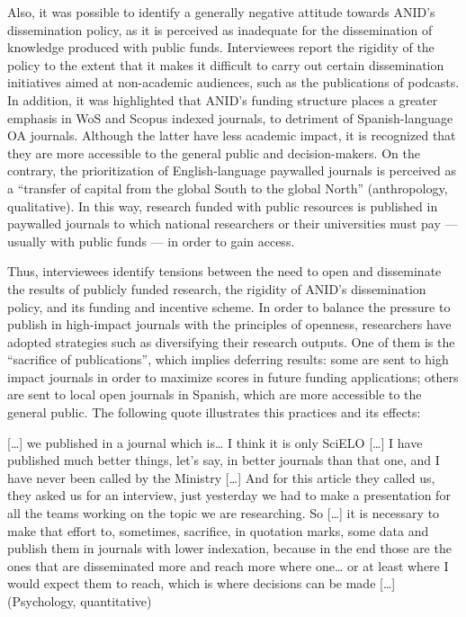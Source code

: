 \documentclass[
  english,
  letterpaper,
]{article}
\begin{document}
Also, it was possible to identify a generally negative attitude towards
ANID's dissemination policy, as it is perceived as inadequate for the
dissemination of knowledge produced with public funds. Interviewees
report the rigidity of the policy to the extent that it makes it
difficult to carry out certain dissemination initiatives aimed at
non-academic audiences, such as the publications of podcasts. In
addition, it was highlighted that ANID's funding structure places a
greater emphasis in WoS and Scopus indexed journals, to detriment of
Spanish-language OA journals. Although the latter have less academic
impact, it is recognized that they are more accessible to the general
public and decision-makers. On the contrary, the prioritization of
English-language paywalled journals is perceived as a ``transfer of
capital from the global South to the global North'' (anthropology,
qualitative). In this way, research funded with public resources is
published in paywalled journals to which national researchers or their
universities must pay --- usually with public funds --- in order to gain
access.

Thus, interviewees identify tensions between the need to open and
disseminate the results of publicly funded research, the rigidity of
ANID's dissemination policy, and its funding and incentive scheme. In
order to balance the pressure to publish in high-impact journals with
the principles of openness, researchers have adopted strategies such as
diversifying their research outputs. One of them is the ``sacrifice of
publications'', which implies deferring results: some are sent to high
impact journals in order to maximize scores in future funding
applications; others are sent to local open journals in Spanish, which
are more accessible to the general public. The following quote
illustrates this practices and its effects:

\begin{tcolorbox}[enhanced jigsaw, opacityback=0, left=2mm, breakable, colframe=quarto-callout-color-frame, arc=.35mm, leftrule=.75mm, toprule=.15mm, bottomrule=.15mm, colback=white, rightrule=.15mm]

{[}\ldots{]} we published in a journal which is\ldots{} I think it is
only SciELO {[}\ldots{]} I have published much better things, let's say,
in better journals than that one, and I have never been called by the
Ministry {[}\ldots{]} And for this article they called us, they asked us
for an interview, just yesterday we had to make a presentation for all
the teams working on the topic we are researching. So {[}\ldots{]} it is
necessary to make that effort to, sometimes, sacrifice, in quotation
marks, some data and publish them in journals with lower indexation,
because in the end those are the ones that are disseminated more and
reach more where one\ldots{} or at least where I would expect them to
reach, which is where decisions can be made {[}\ldots{]} (Psychology,
quantitative)

\end{tcolorbox}
\end{document}
